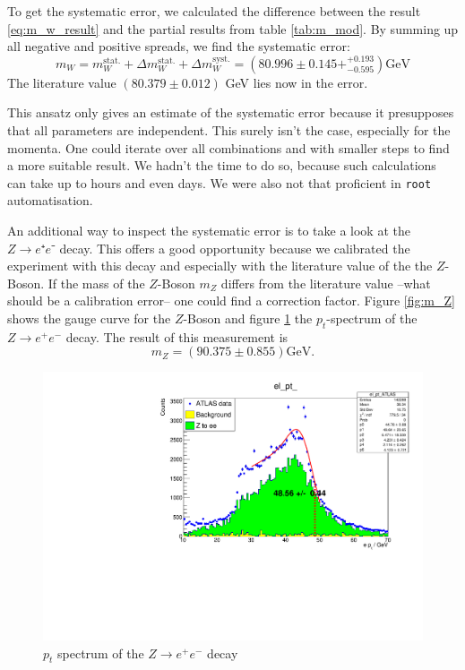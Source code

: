 \documentclass[11pt,a4paper,notitlepage]{scrartcl}
\begin{document}
To get the systematic error, we calculated the difference between the result \ref{eq:m_w_result} and the partial results from table \ref{tab:m_mod}. By summing up all negative and positive spreads, we find the systematic error:
\begin{equation}
	m_W=m_W^\text{stat.}+\Delta m_W^\text{stat.}+\Delta m_W^\text{syst.}=\left(80.996\pm0.145+^{+0.193}_{-0.595}\right)\text{GeV}
\end{equation}
The literature value $(80.379 \pm 0.012)$ GeV \cite{pdg} lies now in the error. 


This ansatz only gives an estimate of the systematic error because it presupposes that all parameters are independent. This surely isn't the case, especially for the momenta. One could iterate over all combinations and with smaller steps to find a more suitable result. We hadn't the time to do so, because such calculations can take up to hours and even days. We were also not that proficient in \texttt{root} automatisation.



An additional way to inspect the systematic error is to take a look at the $Z\to e⁺e⁻$ decay. This offers a good opportunity because we calibrated the experiment with this decay and especially with the literature value of the the $Z$-Boson. If the mass of the $Z$-Boson $m_Z$ differs from the literature value --what should be a calibration error-- one could find a correction factor. Figure \ref{fig:m_Z} shows the gauge curve for the $Z$-Boson and figure \ref{fig:p_Z} the $p_t$-spectrum of the $Z\to e^+e^-$ decay. The result of this measurement is 
$$m_Z=(90.375\pm0.855)\text{GeV}.$$
\begin{figure}[h]
	\centering
	\includegraphics[width=0.7\linewidth]{P1_pics/gauge/Zee_HM.pdf}
	\caption{$p_t$ spectrum of the $Z\to e^+e^-$ decay}\label{fig:p_Z}
\end{figure} 
\end{document}
